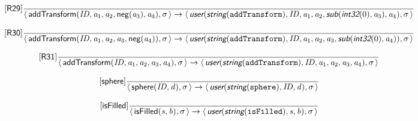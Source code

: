 \documentclass[10pt,leqno]{article}
\newcommand{\artVariable}[1]{\mbox{\em #1\/}}
\newcommand{\artConstructor}[1]{\mbox{\sf #1}}
\newcommand{\artCaseInsensitiveLiteral}[1]{\mbox{\tt #1}}
\newcommand{\artSpecial}[1]{\mbox{\sf\em #1}}
\begin{document}
\begin{equation}
\tag*{[\artConstructor{\sf R29}]}\frac{}{\langle\, \artConstructor{\sf addTransform}(\artVariable{ID}, \artVariable{a$_{1}$}, \artVariable{a$_{2}$}, \artConstructor{\sf neg}(\artVariable{a$_{3}$}), \artVariable{a$_{4}$}), \artVariable{$\sigma$}\,\rangle \rightarrow \langle\, \artSpecial{user}(\artSpecial{string}(\artCaseInsensitiveLiteral{addTransform}), \artVariable{ID}, \artVariable{a$_{1}$}, \artVariable{a$_{2}$}, \artSpecial{sub}(\artSpecial{int32}(0), \artVariable{a$_{3}$}), \artVariable{a$_{4}$}), \artVariable{$\sigma$}\,\rangle }
\end{equation}

\begin{equation}
\tag*{[\artConstructor{\sf R30}]}\frac{}{\langle\, \artConstructor{\sf addTransform}(\artVariable{ID}, \artVariable{a$_{1}$}, \artVariable{a$_{2}$}, \artVariable{a$_{3}$}, \artConstructor{\sf neg}(\artVariable{a$_{4}$})), \artVariable{$\sigma$}\,\rangle \rightarrow \langle\, \artSpecial{user}(\artSpecial{string}(\artCaseInsensitiveLiteral{addTransform}), \artVariable{ID}, \artVariable{a$_{1}$}, \artVariable{a$_{2}$}, \artVariable{a$_{3}$}, \artSpecial{sub}(\artSpecial{int32}(0), \artVariable{a$_{4}$})), \artVariable{$\sigma$}\,\rangle }
\end{equation}

\begin{equation}
\tag*{[\artConstructor{\sf R31}]}\frac{}{\langle\, \artConstructor{\sf addTransform}(\artVariable{ID}, \artVariable{a$_{1}$}, \artVariable{a$_{2}$}, \artVariable{a$_{3}$}, \artVariable{a$_{4}$}), \artVariable{$\sigma$}\,\rangle \rightarrow \langle\, \artSpecial{user}(\artSpecial{string}(\artCaseInsensitiveLiteral{addTransform}), \artVariable{ID}, \artVariable{a$_{1}$}, \artVariable{a$_{2}$}, \artVariable{a$_{3}$}, \artVariable{a$_{4}$}), \artVariable{$\sigma$}\,\rangle }
\end{equation}

\begin{equation}
\tag*{[\artConstructor{\sf sphere}]}\frac{}{\langle\, \artConstructor{\sf sphere}(\artVariable{ID}, \artVariable{d}), \artVariable{$\sigma$}\,\rangle \rightarrow \langle\, \artSpecial{user}(\artSpecial{string}(\artCaseInsensitiveLiteral{sphere}), \artVariable{ID}, \artVariable{d}), \artVariable{$\sigma$}\,\rangle }
\end{equation}

\begin{equation}
\tag*{[\artConstructor{\sf isFilled}]}\frac{}{\langle\, \artConstructor{\sf isFilled}(\artVariable{s}, \artVariable{b}), \artVariable{$\sigma$}\,\rangle \rightarrow \langle\, \artSpecial{user}(\artSpecial{string}(\artCaseInsensitiveLiteral{isFilled}), \artVariable{s}, \artVariable{b}), \artVariable{$\sigma$}\,\rangle }
\end{equation}
\end{document}

